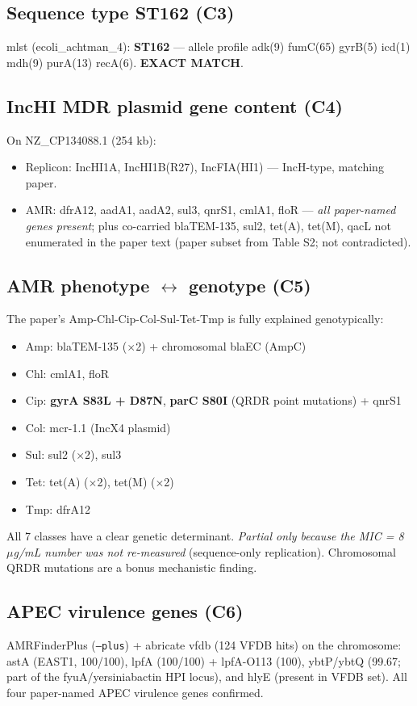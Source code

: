 \documentclass[11pt,letterpaper]{article}
\begin{document}
\subsection{Sequence type ST162 (C3)}
mlst (ecoli\_achtman\_4): \textbf{ST162} --- allele profile
adk(9) fumC(65) gyrB(5) icd(1) mdh(9) purA(13) recA(6). \textbf{EXACT MATCH}.

\subsection{IncHI MDR plasmid gene content (C4)}
On NZ\_CP134088.1 (254 kb):
\begin{itemize}[leftmargin=1.5em]
  \item Replicon: IncHI1A, IncHI1B(R27), IncFIA(HI1) --- IncH-type, matching paper.
  \item AMR: dfrA12, aadA1, aadA2, sul3, qnrS1, cmlA1, floR --- \emph{all paper-named genes present}; plus co-carried blaTEM-135, sul2, tet(A), tet(M), qacL not enumerated in the paper text (paper subset from Table S2; not contradicted).
\end{itemize}

\subsection{AMR phenotype $\leftrightarrow$ genotype (C5)}
The paper's Amp-Chl-Cip-Col-Sul-Tet-Tmp is fully explained genotypically:
\begin{itemize}[leftmargin=1.5em]
  \item Amp: blaTEM-135 ($\times$2) + chromosomal blaEC (AmpC)
  \item Chl: cmlA1, floR
  \item Cip: \textbf{gyrA S83L + D87N}, \textbf{parC S80I} (QRDR point mutations) + qnrS1
  \item Col: mcr-1.1 (IncX4 plasmid)
  \item Sul: sul2 ($\times$2), sul3
  \item Tet: tet(A) ($\times$2), tet(M) ($\times$2)
  \item Tmp: dfrA12
\end{itemize}
All 7 classes have a clear genetic determinant. \emph{Partial only because the MIC =
8 $\mu$g/mL number was not re-measured} (sequence-only replication).
Chromosomal QRDR mutations are a bonus mechanistic finding.

\subsection{APEC virulence genes (C6)}
AMRFinderPlus (\texttt{--plus}) + abricate vfdb (124 VFDB hits) on the chromosome:
astA (EAST1, 100/100), lpfA (100/100) + lpfA-O113 (100), ybtP/ybtQ (99.67; part of the fyuA/yersiniabactin HPI locus), and hlyE (present in VFDB set). All four paper-named APEC virulence genes confirmed.
\end{document}
